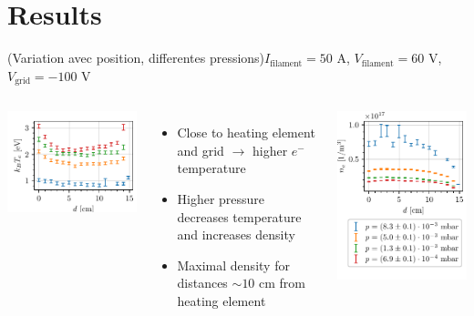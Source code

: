 \documentclass[10pt]{beamer}
\newcommand{\filamentcurrent}{\ensuremath{I_{\mathrm{filament}}}}
\newcommand{\filamentpolarisation}{\ensuremath{V_{\mathrm{filament}}}}
\newcommand{\gridpolarisation}{\ensuremath{V_{\mathrm{grid}}}}
\newcommand{\electron}[0]{$e^{-}$}
\begin{document}
\section{Results}
\begin{frame}{(Variation avec position, differentes pressions)}{$\filamentcurrent = 50$ A, $\filamentpolarisation = 60$ V, $\gridpolarisation = -100$ V}
    \begin{columns}[T]
        \centering
        {\includegraphics[scale=1]{../figures/temperatureeV_position.pdf}}
        \begin{itemize}
            \item Close to heating element and grid \(\rightarrow\) higher \electron temperature
            \item Higher pressure decreases temperature and increases density
            \item Maximal density for distances $\sim 10$ cm from heating element
        \end{itemize}

        \centering
        {\includegraphics[scale=1]{../figures/density_position.pdf}}
    \end{columns}

\end{frame}
    
\end{document}
